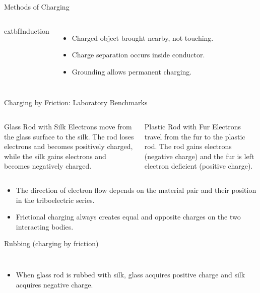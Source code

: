 \begin{frame}
\begin{frame}{Methods of Charging}
\begin{columns}[T,totalwidth=\textwidth]
            	extbf{Induction}
            \begin{itemize}
                \item Charged object brought nearby, not touching.
                \item Charge separation occurs inside conductor.
                \item Grounding allows permanent charging.
            \end{itemize}
    \end{columns}
\end{frame}
\begin{frame}{Charging by Friction: Laboratory Benchmarks}
    \begin{columns}[T,totalwidth=\textwidth]
            \begin{conceptdiagram}[0.95\linewidth]{Glass Rod with Silk}
                Electrons move from the glass surface to the silk. The rod loses electrons and becomes positively charged, while the silk gains electrons and becomes negatively charged.
            \end{conceptdiagram}

            \begin{conceptdiagram}[0.95\linewidth]{Plastic Rod with Fur}
                Electrons travel from the fur to the plastic rod. The rod gains electrons (negative charge) and the fur is left electron deficient (positive charge).
            \end{conceptdiagram}
    \end{columns}

    \vspace{0.3cm}

    \begin{itemize}
        \item The direction of electron flow depends on the material pair and their position in the triboelectric series.
        \item Frictional charging always creates equal and opposite charges on the two interacting bodies.
    \end{itemize}
\end{frame}
\begin{frame}{Rubbing (charging by friction)}
    \begin{columns}
        \begin{itemize}
        \item When glass rod is rubbed with silk, glass acquires positive charge and silk acquires negative charge.
            

\end{itemize}
\end{columns}
\end{frame}
\end{frame}
